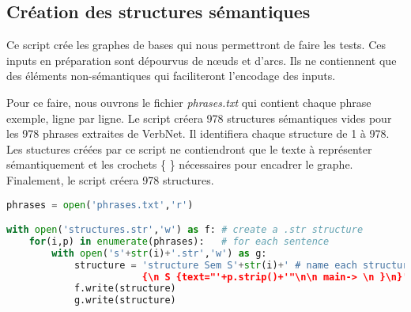 \subsection{Création des structures sémantiques}\label{sec:pythonstruc}

Ce script crée les graphes de bases qui nous permettront de faire les tests. Ces inputs en préparation sont dépourvus de n\oe{}uds et d'arcs. Ils ne contiennent que des éléments non-sémantiques qui faciliteront l'encodage des inputs.

Pour ce faire, nous ouvrons le fichier \emph{phrases.txt} qui contient chaque phrase exemple, ligne par ligne. Le script créera 978 structures sémantiques vides pour les 978 phrases extraites de VerbNet. Il identifiera chaque structure de 1 à 978. Les stuctures créées par ce script ne contiendront que le texte à représenter sémantiquement et les crochets \{ \} nécessaires pour encadrer le graphe. Finalement, le script créera 978 structures.

\begin{lstlisting}[language=Python, caption = Création des structures sémantiques vides, label=structurepython]
phrases = open('phrases.txt','r')

with open('structures.str','w') as f: # create a .str structure
    for(i,p) in enumerate(phrases):   # for each sentence
        with open('s'+str(i)+'.str','w') as g:
            structure = 'structure Sem S'+str(i)+' # name each structure by enumeration
						{\n S {text="'+p.strip()+'"\n\n main-> \n }\n}' # insert as texte the sentence
            f.write(structure)
            g.write(structure)
\end{lstlisting}

